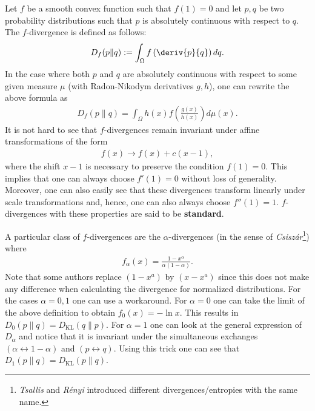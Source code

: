     \begin{example}
        Let $f$ be a smooth convex function such that $f(1)=0$ and let $p,q$ be two probability distributions such that $p$ is absolutely continuous with respect to $q$. The $f$-divergence is defined as follows:
        \begin{gather}
            D_f(p\|q) := \int_\Omega f\left(\deriv{p}{q}\right)dq.
        \end{gather}
        In the case where both $p$ and $q$ are absolutely continuous with respect to some given measure $\mu$ (with Radon-Nikodym derivatives $g,h$), one can rewrite the above formula as
        \begin{gather}
            D_f(p\|q) = \int_\Omega h(x)f\left(\frac{g(x)}{h(x)}\right)d\mu(x).
        \end{gather}
        It is not hard to see that $f$-divergences remain invariant under affine transformations of the form
        \begin{gather}
            f(x)\longrightarrow f(x) + c(x-1),
        \end{gather}
        where the shift $x-1$ is necessary to preserve the condition $f(1)=0$. This implies that one can always choose $f'(1)=0$ without loss of generality. Moreover, one can also easily see that these divergences transform linearly under scale transformations and, hence, one can also always choose $f''(1)=1$. $f$-divergences with these properties are said to be \textbf{standard}.

        A particular class of $f$-divergences are the $\alpha$-divergences (in the sense of \textit{Csisz\'ar}\footnote{\textit{Tsallis} and \textit{R\'enyi} introduced different divergences/entropies with the same name.}) where
        \begin{gather}
            f_\alpha(x) = \frac{1-x^\alpha}{\alpha(1-\alpha)}.
        \end{gather}
        Note that some authors replace $(1-x^a)$ by $(x-x^a)$ since this does not make any difference when calculating the divergence for normalized distributions. For the cases $\alpha=0,1$ one can use a workaround. For $\alpha=0$ one can take the limit of the above definition to obtain $f_0(x) = -\ln x$. This results in $D_0(p\|q) = D_\mathrm{KL}(q\|p)$. For $\alpha=1$ one can look at the general expression of $D_\alpha$ and notice that it is invariant under the simultaneous exchanges $(\alpha\leftrightarrow1-\alpha)$ and $(p\leftrightarrow q)$. Using this trick one can see that $D_1(p\|q) = D_\mathrm{KL}(p\|q)$.
    \end{example}

